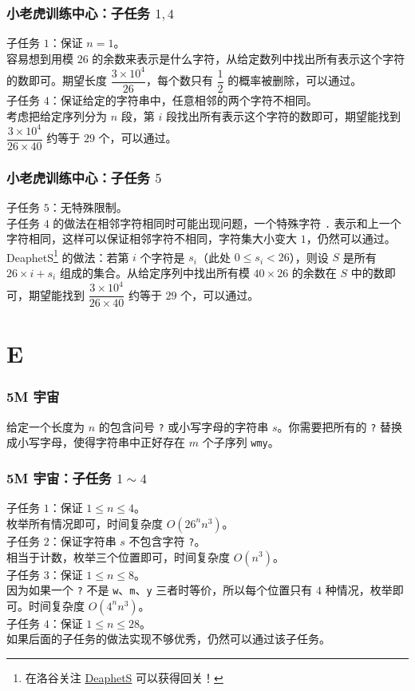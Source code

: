 \documentclass{beamer}
\begin{document}
\begin{frame}
\frametitle{小老虎训练中心：子任务 $1, 4$}
子任务 $1$：保证 $n = 1$。\\
\pause
容易想到用模 $26$ 的余数来表示是什么字符，从给定数列中找出所有表示这个字符的数即可。期望长度 $\dfrac{3 \times 10^4}{26}$，每个数只有 $\dfrac 12$ 的概率被删除，可以通过。\\
\pause
子任务 $4$：保证给定的字符串中，任意相邻的两个字符不相同。\\
\pause
考虑把给定序列分为 $n$ 段，第 $i$ 段找出所有表示这个字符的数即可，期望能找到 $\dfrac{3 \times 10^4}{26 \times 40}$ 约等于 $29$ 个，可以通过。
\end{frame}

\begin{frame}
\frametitle{小老虎训练中心：子任务 $5$}
子任务 $5$：无特殊限制。\\
\pause
子任务 $4$ 的做法在相邻字符相同时可能出现问题，一个特殊字符 \texttt{.} 表示和上一个字符相同，这样可以保证相邻字符不相同，字符集大小变大 $1$，仍然可以通过。\\
\pause
DeaphetS\footnote{在洛谷关注 \href{https://www.luogu.com.cn/user/4672}{DeaphetS} 可以获得回关！} 的做法：若第 $i$ 个字符是 $s_i$（此处 $0 \leq s_i < 26$），则设 $S$ 是所有 $26 \times i + s_i$ 组成的集合。从给定序列中找出所有模 $40 \times 26$ 的余数在 $S$ 中的数即可，期望能找到 $\dfrac{3 \times 10^4}{26 \times 40}$ 约等于 $29$ 个，可以通过。
\end{frame}

\section{E}

\begin{frame}
\frametitle{5M 宇宙}
给定一个长度为 $n$ 的包含问号 \texttt{?} 或小写字母的字符串 $s$。你需要把所有的 \texttt{?} 替换成小写字母，使得字符串中正好存在 $m$ 个子序列 \texttt{wmy}。
\end{frame}

\begin{frame}
\frametitle{5M 宇宙：子任务 $1 \sim 4$}
子任务 $1$：保证 $1 \leq n \leq 4$。\\
\pause
枚举所有情况即可，时间复杂度 $O(26^n n^3)$。\\
\pause
子任务 $2$：保证字符串 $s$ 不包含字符 \texttt{?}。\\
\pause
相当于计数，枚举三个位置即可，时间复杂度 $O(n^3)$。\\
\pause
子任务 $3$：保证 $1 \leq n \leq 8$。\\
\pause
因为如果一个 \texttt{?} 不是 \texttt{w}、\texttt{m}、\texttt{y} 三者时等价，所以每个位置只有 $4$ 种情况，枚举即可。时间复杂度 $O(4^n n^3)$。\\
\pause
子任务 $4$：保证 $1 \leq n \leq 28$。\\
\pause
如果后面的子任务的做法实现不够优秀，仍然可以通过该子任务。
\end{frame}
\end{document}
